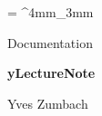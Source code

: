 \documentclass[a4paper, 11pt, oneside, fleqn]{article}
\newcommand{\inColor}[1]{{\bfseries\color{mainColor}#1}}
\newcommand{\myTitle}{\inColor{\fontsize{1.3cm}{1em}\selectfont yLectureNote}}
\begin{document}
	\everyrow{\tabucline[.4mm  white]{}}
	\tabulinesep = ^4mm_3mm
	


	\begin{flushleft}
		\begin{minipage}{\widthof{\myTitle}}
			{\fontsize{.6cm}{1em}\selectfont\color{mainColor}
				Documentation
			}
			\begin{spacing}{3}
				\myTitle
			\end{spacing}
			\vspace*{-10mm}
			\begin{flushright}
				Yves Zumbach
			\end{flushright}
		\end{minipage}
	\end{flushleft}
	
	
	\vspace*{2cm}
	
\end{document}
